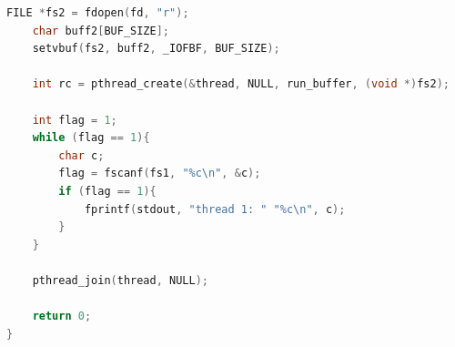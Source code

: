 \documentclass[a4paper,oneside,12pt]{extreport}
\begin{document}
\begin{task}
\begin{lstlisting}[language=C]
	FILE *fs2 = fdopen(fd, "r");
	char buff2[BUF_SIZE];
	setvbuf(fs2, buff2, _IOFBF, BUF_SIZE);
	
	int rc = pthread_create(&thread, NULL, run_buffer, (void *)fs2);
	
	int flag = 1;
	while (flag == 1){
		char c;
		flag = fscanf(fs1, "%c\n", &c);
		if (flag == 1){
			fprintf(stdout, "thread 1: " "%c\n", c);
		}
	}
	
	pthread_join(thread, NULL);
	
	return 0;
}
\end{lstlisting}

	\begin{figure}[ht!]
	\end{figure}

\end{task}

\newpage
\end{document}
